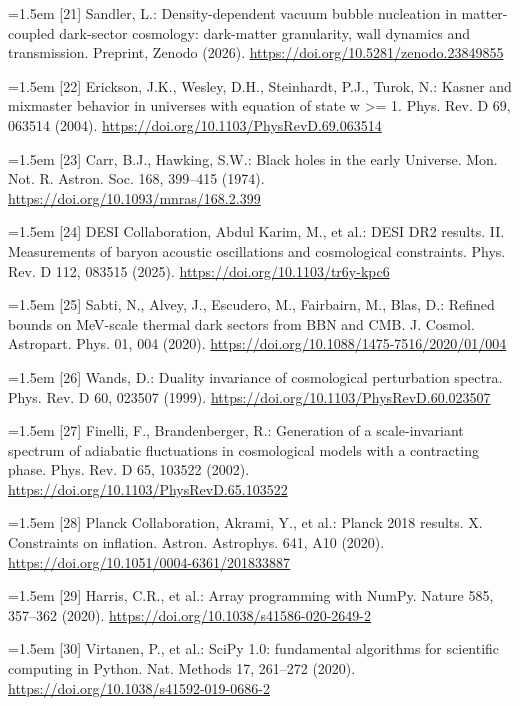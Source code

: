 \documentclass[11pt,a4paper]{article}
\begin{document}
\noindent\hangindent=1.5em [21] Sandler, L.: Density-dependent vacuum bubble nucleation in matter-coupled dark-sector cosmology: dark-matter granularity, wall dynamics and transmission. Preprint, Zenodo (2026). \url{https://doi.org/10.5281/zenodo.23849855}\par
\noindent\hangindent=1.5em [22] Erickson, J.K., Wesley, D.H., Steinhardt, P.J., Turok, N.: Kasner and mixmaster behavior in universes with equation of state w >= 1. Phys. Rev. D 69, 063514 (2004). \url{https://doi.org/10.1103/PhysRevD.69.063514}\par
\noindent\hangindent=1.5em [23] Carr, B.J., Hawking, S.W.: Black holes in the early Universe. Mon. Not. R. Astron. Soc. 168, 399--415 (1974). \url{https://doi.org/10.1093/mnras/168.2.399}\par
\noindent\hangindent=1.5em [24] DESI Collaboration, Abdul Karim, M., et al.: DESI DR2 results. II. Measurements of baryon acoustic oscillations and cosmological constraints. Phys. Rev. D 112, 083515 (2025). \url{https://doi.org/10.1103/tr6y-kpc6}\par
\noindent\hangindent=1.5em [25] Sabti, N., Alvey, J., Escudero, M., Fairbairn, M., Blas, D.: Refined bounds on MeV-scale thermal dark sectors from BBN and CMB. J. Cosmol. Astropart. Phys. 01, 004 (2020). \url{https://doi.org/10.1088/1475-7516/2020/01/004}\par
\noindent\hangindent=1.5em [26] Wands, D.: Duality invariance of cosmological perturbation spectra. Phys. Rev. D 60, 023507 (1999). \url{https://doi.org/10.1103/PhysRevD.60.023507}\par
\noindent\hangindent=1.5em [27] Finelli, F., Brandenberger, R.: Generation of a scale-invariant spectrum of adiabatic fluctuations in cosmological models with a contracting phase. Phys. Rev. D 65, 103522 (2002). \url{https://doi.org/10.1103/PhysRevD.65.103522}\par
\noindent\hangindent=1.5em [28] Planck Collaboration, Akrami, Y., et al.: Planck 2018 results. X. Constraints on inflation. Astron. Astrophys. 641, A10 (2020). \url{https://doi.org/10.1051/0004-6361/201833887}\par
\noindent\hangindent=1.5em [29] Harris, C.R., et al.: Array programming with NumPy. Nature 585, 357--362 (2020). \url{https://doi.org/10.1038/s41586-020-2649-2}\par
\noindent\hangindent=1.5em [30] Virtanen, P., et al.: SciPy 1.0: fundamental algorithms for scientific computing in Python. Nat. Methods 17, 261--272 (2020). \url{https://doi.org/10.1038/s41592-019-0686-2}\par
\end{document}
